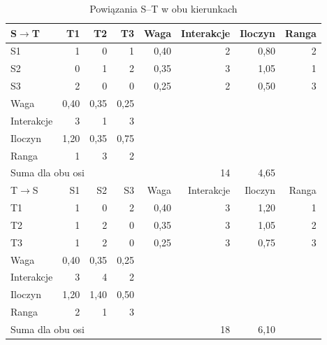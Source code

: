 \documentclass[12pt,a4paper,oneside]{article}
\begin{document}
\begin{table}[H]\centering\small\renewcommand{\arraystretch}{0.96}
\caption{Powiązania S--T w obu kierunkach}
\begin{tabular}{@{}lrrrrrrr@{}}\toprule
S$\to$T & T1 & T2 & T3 & Waga & Interakcje & Iloczyn & Ranga \\
\midrule
S1 & 1 & 0 & 1 & 0,40 & 2 & 0,80 & 2 \\
S2 & 0 & 1 & 2 & 0,35 & 3 & 1,05 & 1 \\
S3 & 2 & 0 & 0 & 0,25 & 2 & 0,50 & 3 \\
Waga & 0,40 & 0,35 & 0,25 &  &  &  &  \\
Interakcje & 3 & 1 & 3 &  &  &  &  \\
Iloczyn & 1,20 & 0,35 & 0,75 &  &  &  &  \\
Ranga & 1 & 3 & 2 &  &  &  &  \\
\multicolumn{5}{l}{Suma dla obu osi} & 14 & 4,65 &  \\
\midrule
T$\to$S & S1 & S2 & S3 & Waga & Interakcje & Iloczyn & Ranga \\
\midrule
T1 & 1 & 0 & 2 & 0,40 & 3 & 1,20 & 1 \\
T2 & 1 & 2 & 0 & 0,35 & 3 & 1,05 & 2 \\
T3 & 1 & 2 & 0 & 0,25 & 3 & 0,75 & 3 \\
Waga & 0,40 & 0,35 & 0,25 &  &  &  &  \\
Interakcje & 3 & 4 & 2 &  &  &  &  \\
Iloczyn & 1,20 & 1,40 & 0,50 &  &  &  &  \\
Ranga & 2 & 1 & 3 &  &  &  &  \\
\multicolumn{5}{l}{Suma dla obu osi} & 18 & 6,10 &  \\
\bottomrule
\end{tabular}\end{table}
\end{document}
